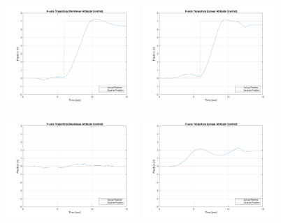 \begin{figure}
    \centering
    \includegraphics[width=0.45\textwidth]{graphics/experiment_plots/pitch_plus_non_position_x.png}
    \includegraphics[width=0.45\textwidth]{graphics/experiment_plots/pitch_plus_pid_position_x.png}
    
    \includegraphics[width=0.45\textwidth]{graphics/experiment_plots/pitch_plus_non_position_y.png}
    \includegraphics[width=0.45\textwidth]{graphics/experiment_plots/pitch_plus_pid_position_y.png}
    

\end{figure}
